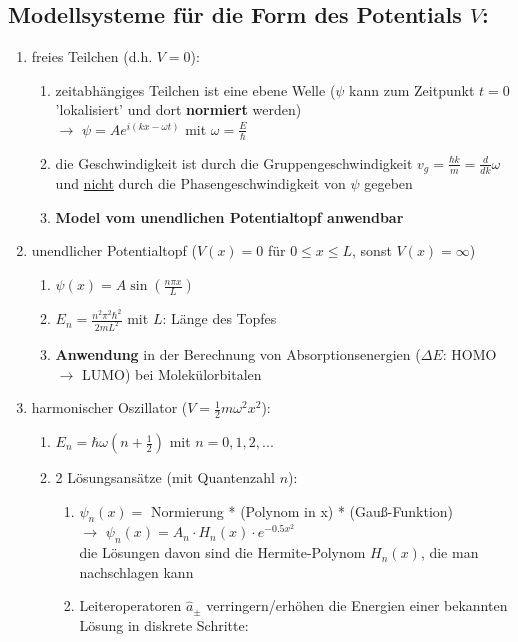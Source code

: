 \subsection{Modellsysteme für die Form des Potentials $V$:}
\begin{enumerate}
    \item freies Teilchen (d.h. $V=0$):
    \begin{enumerate}
        \item zeitabhängiges Teilchen ist eine ebene Welle ($\psi$ kann zum Zeitpunkt $t=0$ 'lokalisiert'  
        und dort \textbf{normiert} werden) \\
        $\rightarrow$ $\psi =Ae^{i(kx-\omega t)}$ mit $\omega=\frac{E}{\hbar}$
        \item die Geschwindigkeit ist durch die Gruppengeschwindigkeit $v_g=\frac{\hbar k}{m}=\frac{d}{dk}\omega$ und \underline{nicht}
        durch die Phasengeschwindigkeit von $\psi$ gegeben
        \item \textbf{Model vom unendlichen Potentialtopf anwendbar}
    \end{enumerate}
    \item unendlicher Potentialtopf ($V(x)=0$ für $0\leq x\leq L$, sonst $V(x)=\infty$)
        \begin{enumerate}
            \item $\psi(x)=A\sin(\frac{n\pi x}{L})$
            \item $E_n=\frac{n^2 \pi^2 \hbar^2}{2mL^2}$ mit $L$: Länge des Topfes 
            \item \textbf{Anwendung} in der Berechnung von Absorptionsenergien ($\Delta E$: HOMO $\rightarrow$ LUMO) bei Molekülorbitalen 
        \end{enumerate} 
    \item harmonischer Oszillator ($V=\frac{1}{2}m\omega^2x^2$):
    \begin{enumerate}
        \item $E_n=\hbar\omega(n+\frac{1}{2})$ mit $n=0,1,2,...$
        \item 2 Lösungsansätze (mit Quantenzahl $n$):
        \begin{enumerate}
            \item $\psi_n(x)=$ Normierung * (Polynom in x) * (Gauß-Funktion)\\
            $\rightarrow$ $\psi_n(x)=A_n\cdot H_n(x) \cdot e^{-0.5x^2}$ \\
            die Lösungen davon sind die Hermite-Polynom $H_n(x)$, die man nachschlagen kann
            \item Leiteroperatoren $\hat{a}_\pm$ verringern/erhöhen die Energien einer bekannten Lösung in diskrete Schritte:\\

\end{enumerate}
\end{enumerate}
\end{enumerate}
